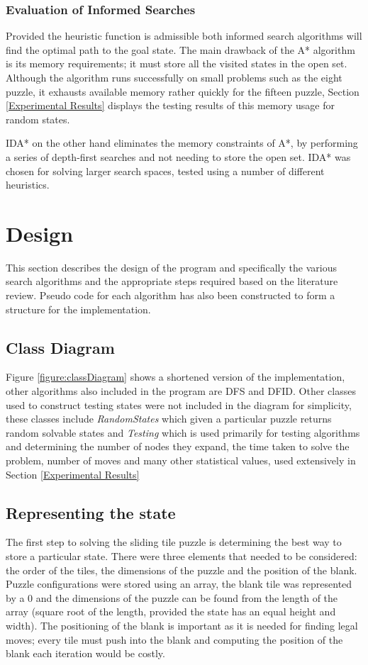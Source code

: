 \documentclass[final]{cmpreport}
\begin{document}
\subsubsection{Evaluation of Informed Searches}
Provided the heuristic function is admissible both informed search algorithms will find the optimal path to the goal state. The main drawback of the A* algorithm is its memory requirements; it must store all the visited states in the open set. Although the algorithm runs successfully on small problems such as the eight puzzle, it exhausts available memory rather quickly for the fifteen puzzle, Section \ref{Experimental Results} displays the testing results of this memory usage for random states. 

IDA* on the other hand eliminates the memory constraints of A*, by performing a series of depth-first searches and not needing to store the open set. IDA* was chosen for solving larger search spaces, tested using a number of different heuristics. 




\section{Design}
This section describes the design of the program and specifically the various search algorithms and the appropriate steps required based on the literature review. Pseudo code for each algorithm has also been constructed to form a structure for the implementation.
\subsection{Class Diagram}
Figure \ref{figure:classDiagram} shows a shortened version of the implementation, other algorithms also included in the program are DFS and DFID. Other classes used to construct testing states were not included in the diagram for simplicity, these classes include \textit{RandomStates} which given a particular puzzle returns random solvable states and \textit{Testing} which is used primarily for testing algorithms and determining the number of nodes they expand, the time taken to solve the problem, number of moves and many other statistical values, used extensively in Section \ref{Experimental Results}


\subsection{Representing the state}
The first step to solving the sliding tile puzzle is determining the best way to store a particular state. There were three elements that needed to be considered: the order of the tiles, the dimensions of the puzzle and the position of the blank. Puzzle configurations were stored using an array, the blank tile was represented by a 0 and the dimensions of the puzzle can be found from the length of the array (square root of the length, provided the state has an equal height and width). The positioning of the blank is important as it is needed for finding legal moves; every tile must push into the blank and computing the position of the blank each iteration would be costly.
\end{document}
